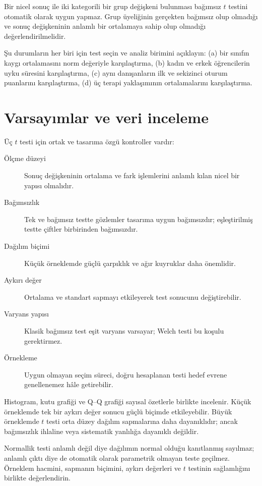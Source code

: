 Bir nicel sonuç ile iki kategorili bir grup değişkeni bulunması bağımsız $t$
testini otomatik olarak uygun yapmaz. Grup üyeliğinin gerçekten bağımsız olup
olmadığı ve sonuç değişkeninin anlamlı bir ortalamaya sahip olup olmadığı
değerlendirilmelidir.

\begin{etkinlik}
Şu durumların her biri için test seçin ve analiz birimini açıklayın: (a) bir
sınıfın kaygı ortalamasını norm değeriyle karşılaştırma, (b) kadın ve erkek
öğrencilerin uyku süresini karşılaştırma, (c) aynı danışanların ilk ve sekizinci
oturum puanlarını karşılaştırma, (d) üç terapi yaklaşımının ortalamalarını
karşılaştırma.
\end{etkinlik}

\section{Varsayımlar ve veri inceleme}

Üç $t$ testi için ortak ve tasarıma özgü kontroller vardır:

\begin{description}
  \item[Ölçme düzeyi] Sonuç değişkeninin ortalama ve fark işlemlerini anlamlı kılan nicel bir yapısı olmalıdır.
  \item[Bağımsızlık] Tek ve bağımsız testte gözlemler tasarıma uygun bağımsızdır; eşleştirilmiş testte çiftler birbirinden bağımsızdır.
  \item[Dağılım biçimi] Küçük örneklemde güçlü çarpıklık ve ağır kuyruklar daha önemlidir.
  \item[Aykırı değer] Ortalama ve standart sapmayı etkileyerek test sonucunu değiştirebilir.
  \item[Varyans yapısı] Klasik bağımsız test eşit varyans varsayar; Welch testi bu koşulu gerektirmez.
  \item[Örnekleme] Uygun olmayan seçim süreci, doğru hesaplanan testi hedef evrene genellenemez hâle getirebilir.
\end{description}

Histogram, kutu grafiği ve Q--Q grafiği sayısal özetlerle birlikte incelenir.
Küçük örneklemde tek bir aykırı değer sonucu güçlü biçimde etkileyebilir. Büyük
örneklemde $t$ testi orta düzey dağılım sapmalarına daha dayanıklıdır; ancak
bağımsızlık ihlaline veya sistematik yanlılığa dayanıklı değildir.

\begin{assumptionbox}
Normallik testi anlamlı değil diye dağılımın normal olduğu kanıtlanmış sayılmaz;
anlamlı çıktı diye de otomatik olarak parametrik olmayan teste geçilmez.
Örneklem hacmini, sapmanın biçimini, aykırı değerleri ve $t$ testinin
sağlamlığını birlikte değerlendirin.
\end{assumptionbox}

